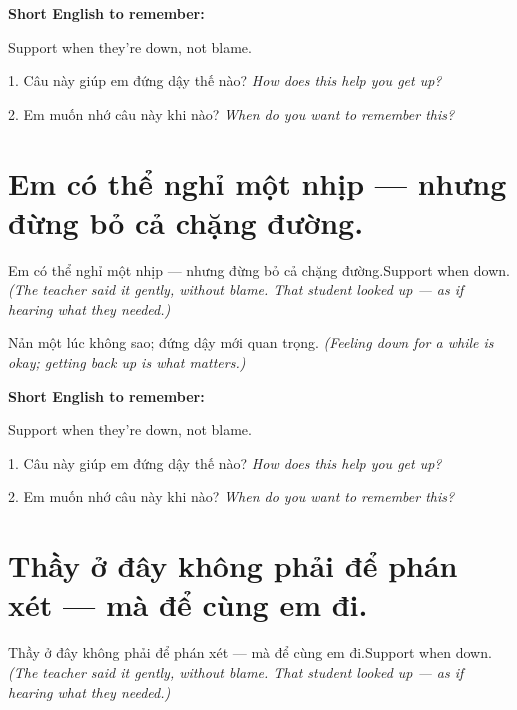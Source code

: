 \begin{ghinhoanh}
\textbf{Short English to remember:}

Support when they're down, not blame.

\end{ghinhoanh}

\begin{tuhocnhanh}
1. Câu này giúp em đứng dậy thế nào? \textit{How does this help you get up?}

2. Em muốn nhớ câu này khi nào? \textit{When do you want to remember this?}
\end{tuhocnhanh}
\ngancach


\section{Em có thể nghỉ một nhịp — nhưng đừng bỏ cả chặng đường.}
\begin{truyen}{Em có thể nghỉ một nhịp — nhưng đừng bỏ cả chặng đường.}{Support when down.}
\textit{(The teacher said it gently, without blame. That student looked up — as if hearing what they needed.)}
\end{truyen}

\begin{baihoc}
Nản một lúc không sao; đứng dậy mới quan trọng.
\textit{(Feeling down for a while is okay; getting back up is what matters.)}
\end{baihoc}

\begin{ghinhoanh}
\textbf{Short English to remember:}

Support when they're down, not blame.

\end{ghinhoanh}

\begin{tuhocnhanh}
1. Câu này giúp em đứng dậy thế nào? \textit{How does this help you get up?}

2. Em muốn nhớ câu này khi nào? \textit{When do you want to remember this?}
\end{tuhocnhanh}
\ngancach


\section{Thầy ở đây không phải để phán xét — mà để cùng em đi.}
\begin{truyen}{Thầy ở đây không phải để phán xét — mà để cùng em đi.}{Support when down.}
\textit{(The teacher said it gently, without blame. That student looked up — as if hearing what they needed.)}
\end{truyen}

